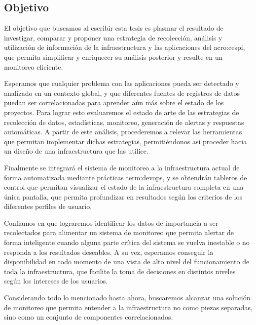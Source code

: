 \subsection{Objetivo}
\label{objetivo}

El objetivo que buscamos al escribir esta tesis es plasmar el resultado de
investigar, comparar y proponer una estrategia de recolección, análisis y
utilización de información de la infraestructura y las aplicaciones del
\gls{acro:cespi}, que permita simplificar y enriquecer su análisis posterior y
resulte en un monitoreo eficiente.

Esperamos que cualquier problema con las aplicaciones pueda ser detectado y
analizado en un contexto global, y que diferentes fuentes de registros de datos
puedan ser correlacionadas para aprender aún más sobre el estado de los
proyectos. Para lograr esto evaluaremos el estado de arte de las estrategias
de recolección de datos, estadísticas, monitoreo, generación de alertas y
respuestas automáticas. A partir de este análisis, procederemos a relevar las
herramientas que permitan implementar dichas estrategias, permitiéndonos así
proceder hacia un diseño de una infraestructura que las utilice.

Finalmente se integrará el sistema de monitoreo a la infraestructura actual de
forma automatizada mediante prácticas \gls{term:devops}, y se obtendrán
tableros de control que permitan visualizar el estado de la infraestructura
completa en una única pantalla, que permita profundizar en resultados según los
criterios de los diferentes perfiles de usuario.

Confiamos en que lograremos identificar los datos de importancia a ser
recolectados para alimentar un sistema de monitoreo que permita alertar de
forma inteligente cuando alguna parte crítica del sistema se vuelva inestable o
no responda a los resultados deseables. A su vez, esperamos conseguir la
disponibilidad en todo momento de una vista de alto nivel del funcionamiento de
toda la infraestructura, que facilite la toma de decisiones en distintos
niveles según los intereses de los usuarios.

Considerando todo lo mencionado hasta ahora, buscaremos alcanzar una solución
de monitoreo que permita entender a la infraestructura no como piezas
separadas, sino como un conjunto de componentes correlacionados.

